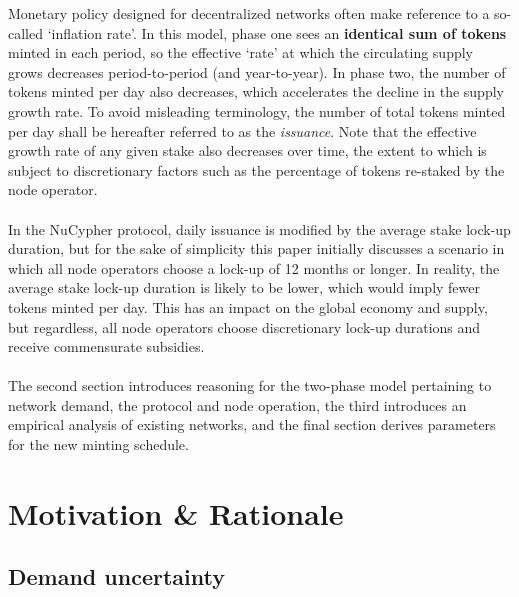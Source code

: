 \documentclass[8pt]{article}
\begin{document}
Monetary policy designed for decentralized networks often make reference to a so-called `inflation rate'. In this model, phase one sees an \textbf{identical sum of tokens} minted in each period, so the effective `rate' at which the circulating supply grows decreases period-to-period (and year-to-year). In phase two, the number of tokens minted per day also decreases, which accelerates the decline in the supply growth rate. To avoid misleading terminology, the number of total tokens minted per day shall be hereafter referred to as the \textit{issuance}. Note that the effective growth rate of any given stake also decreases over time, the extent to which is subject to discretionary factors such as the percentage of tokens re-staked by the node operator. 
\\\\
In the NuCypher protocol, daily issuance is modified by the average stake lock-up duration, but for the sake of simplicity this paper initially discusses a scenario in which all node operators choose a lock-up of 12 months or longer. In reality, the average stake lock-up duration is likely to be lower, which would imply fewer tokens minted per day. This has an impact on the global economy and supply, but regardless, all node operators choose discretionary lock-up durations and receive commensurate subsidies.
\\\\
The second section introduces reasoning for the two-phase model pertaining to network demand, the protocol and node operation, the third introduces an empirical analysis of existing networks, and the final section derives parameters for the new minting schedule.

\section{Motivation \& Rationale}

\subsection{Demand uncertainty}
\end{document}
